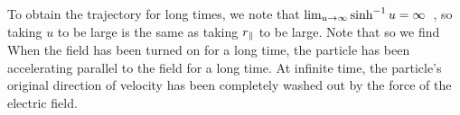 {	To obtain the trajectory for long times, we note that $\lim_{u \to \infty} \sinh^{-1} u = \infty$~\cite{Arcsinh}, so taking $u$ to be large is the same as taking $r_\parallel$ to be large.  Note that
	so we find
	  When the field has been turned on for a long time, the particle has been accelerating parallel to the field for a long time.  At infinite time, the particle's original direction of velocity has been completely washed out by the force of the electric field.
	
}
